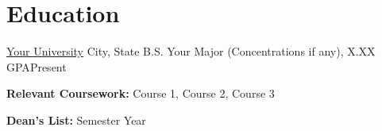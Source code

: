 \section{Education}
  \resumeSubHeadingListStart
      \resumeSubheading
              {\href{https://yourschool.edu}{\underline{Your University}} }{City, State}
              {B.S. Your Major (Concentrations if any), X.XX GPA}{Present}
              \resumeItemListStart 
                  \item{
                    \textbf{Relevant Coursework:} Course 1, Course 2, Course 3
                    }
                    \item {
                    \textbf{Dean's List:} Semester Year
                    }
              \resumeItemListEnd
          
          
  \resumeSubHeadingListEnd
